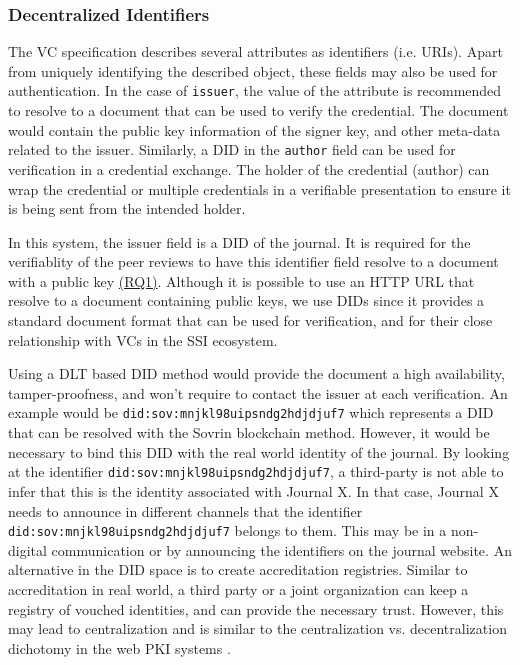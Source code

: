\subsubsection{Decentralized Identifiers}

The \acrshort{VC} specification describes several attributes as identifiers (i.e. \acrshort{URI}s). Apart from uniquely identifying the described object, these fields may also be used for authentication. In the case of \lstinline{issuer}, the value of the attribute is recommended to resolve to a document that can be used to verify the credential. The document would contain the public key information of the signer key, and other meta-data related to the issuer. Similarly, a \acrshort{DID} in the \lstinline{author} field can be used for verification in a credential exchange. The holder of the credential (author) can wrap the credential or multiple credentials in a verifiable presentation to ensure it is being sent from the intended holder. 

In this system, the issuer field is a \acrshort{DID} of the journal. It is required for the verifiablity of the peer reviews to have this identifier field resolve to a document with a public key \hyperref[rq:verifiable]{(RQ1)}. Although it is possible to use an \acrshort{HTTP} \acrshort{URL} that resolve to a document containing public keys, we use \acrshort{DID}s since it provides a standard document format that can be used for verification, and for their close relationship with \acrshort{VC}s in the \acrshort{SSI} ecosystem. 

Using a \acrshort{DLT} based \acrshort{DID} method would provide the document a high availability, tamper-proofness, and won't require to contact the issuer at each verification. An example would be \lstinline{did:sov:mnjkl98uipsndg2hdjdjuf7} which represents a DID that can be resolved with the Sovrin blockchain method. However, it would be necessary to bind this \acrshort{DID} with the real world identity of the journal. By looking at the identifier \lstinline{did:sov:mnjkl98uipsndg2hdjdjuf7}, a third-party is not able to infer that this is the identity associated with Journal X. In that case, Journal X needs to announce in different channels that the identifier \lstinline{did:sov:mnjkl98uipsndg2hdjdjuf7} belongs to them. This may be in a non-digital communication or by announcing the identifiers on the journal website. An alternative in the \acrshort{DID} space is to create accreditation registries. Similar to accreditation in real world, a third party or a joint organization can keep a registry of vouched identities, and can provide the necessary trust. However, this may lead to centralization and is similar to the centralization vs. decentralization dichotomy in the web \acrshort{PKI} systems \parencite{Perlman1999}.

